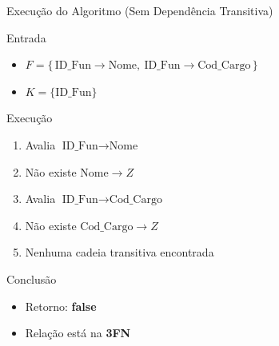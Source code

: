 \documentclass[9pt]{beamer}
\begin{document}
\begin{frame}{Execução do Algoritmo (Sem Dependência Transitiva)}
\small

\begin{block}{Entrada}
\begin{itemize}
    \item $F = \{\, \text{ID\_Fun} \to \text{Nome},\ \text{ID\_Fun} \to \text{Cod\_Cargo} \,\}$
    \item $K = \{\text{ID\_Fun}\}$
\end{itemize}
\end{block}

\vspace{0.3cm}

\begin{block}{Execução}
\begin{enumerate}
    \item Avalia $\text{ID\_Fun} \to \text{Nome}$
    \item Não existe $\text{Nome} \to Z$

    \item Avalia $\text{ID\_Fun} \to \text{Cod\_Cargo}$
    \item Não existe $\text{Cod\_Cargo} \to Z$

    \item Nenhuma cadeia transitiva encontrada
\end{enumerate}
\end{block}

\begin{alertblock}{Conclusão}
\begin{itemize}
    \item Retorno: \textbf{false}
    \item Relação está na \textbf{3FN}
\end{itemize}
\end{alertblock}

\end{frame}
\end{document}

